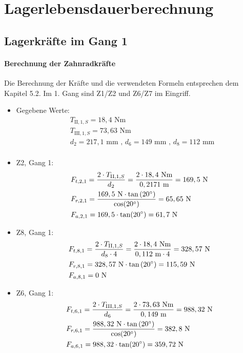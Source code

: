 \newpage
\chapter{Lagerlebensdauerberechnung}
\section{Lagerkräfte im Gang 1}
\subsubsection{Berechnung der Zahnradkräfte}
Die Berechnung der Kräfte und die verwendeten Formeln entsprechen dem Kapitel 5.2. Im 1. Gang sind Z1/Z2 und Z6/Z7 im Eingriff.
\begin{itemize}
\item Gegebene Werte: 
	\begin{align*}
	&T_{\mathrm{II},1,S} = 18,4\text{ Nm} \\
	&T_{\mathrm{III},1,S} = 73,63\text{ Nm} \\	
	&d_2 = 217,1\text{ mm} \text{ , } d_6 = 149 \text{ mm , } d_8 = 112 \text{ mm}\\
	\end{align*}
\item Z2, Gang 1:
	\begin{align*} 
	&F_{t,2,1} = \frac{2\cdot T_{\mathrm{II},1,S}}{d_2} = \frac{2 \cdot 18,4 \text{ Nm}}{0,2171 \text{ m}} = 169,5 \text{ N}\\ 
	&F_{r,2,1} = \frac{169,5 \text{ N} \cdot \tan{(20^\circ)}}{\cos(20^\circ)} = 65,65\text{ N}\\ 
	&F_{a,2,1} =169,5 \cdot \tan(20^\circ) =61,7 \text{ N}
	\end{align*}
\item Z8, Gang 1:
	\begin{align*}
	&F_{t,8,1} = \frac{2\cdot T_{\mathrm{II},1,S}}{d_8 \cdot 4} = \frac{2 \cdot 18,4 \text{ Nm}}{0,112 \text{ m} \cdot 4} = 328,57\text{ N}\\ 
	&F_{r,8,1} = 328,57 \text{ N} \cdot \tan{(20^\circ)} = 115,59\text{ N}\\ 
	&F_{a,8,1} =0 \text{ N}\\
	\end{align*}
\item Z6, Gang 1:
	\begin{align*} 
	&F_{t,6,1} = \frac{2\cdot T_{\mathrm{III},1,S}}{d_6} = \frac{2 \cdot 73,63 \text{ Nm}}{0,149 \text{ m}} = 988,32 \text{ N}\\ 
	&F_{r,6,1} = \frac{988,32 \text{ N} \cdot \tan{(20^\circ)}}{\cos(20^\circ)} = 382,8\text{ N}\\ 
	&F_{a,6,1} =988,32 \cdot \tan(20^\circ) =359,72 \text{ N}
	\end{align*}
\end{itemize}
